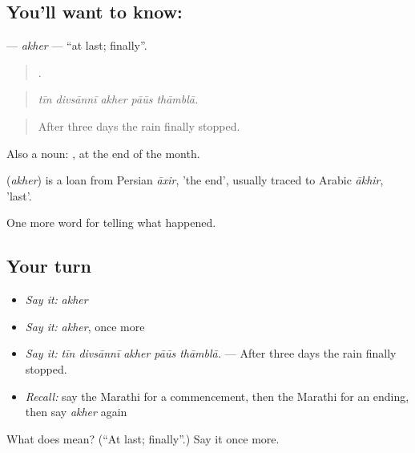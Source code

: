 \subsection*{You'll want to know: }
\textbf{} — \emph{akher} — \textquotedblleft{}at last; finally\textquotedblright{}.

\begin{quote}
    .
\end{quote}

\begin{quote}
\emph{tīn divsānnī akher pāūs thāmblā.}
\end{quote}

\begin{quote}
After three days the rain finally stopped.
\end{quote}

Also a noun:  , at the end of the month.

\begin{cousinweb}
\textbf{} (\emph{akher}) is a loan from Persian \emph{āxir}, 'the end', usually traced to Arabic \emph{ākhir}, 'last'.
\end{cousinweb}

\begin{grammarlens}[title={What you've built}]
One more word for telling what happened.
\end{grammarlens}

\subsection*{Your turn}
\begin{itemize}
\raggedright
  \item \emph{Say it:} \emph{akher}
  \item \emph{Say it:} \emph{akher}, once more
  \item \emph{Say it:} \emph{tīn divsānnī akher pāūs thāmblā.} — After three days the rain finally stopped.
  \item \emph{Recall:} say the Marathi for a commencement, then the Marathi for an ending, then say \emph{akher} again
\end{itemize}

\begin{tcolorbox}[breakable,colback=teal!4,colframe=teal!35!black,title={Before you move on}]
What does  mean? (\textquotedblleft{}At last; finally\textquotedblright{}.) Say it once more.
\end{tcolorbox}
